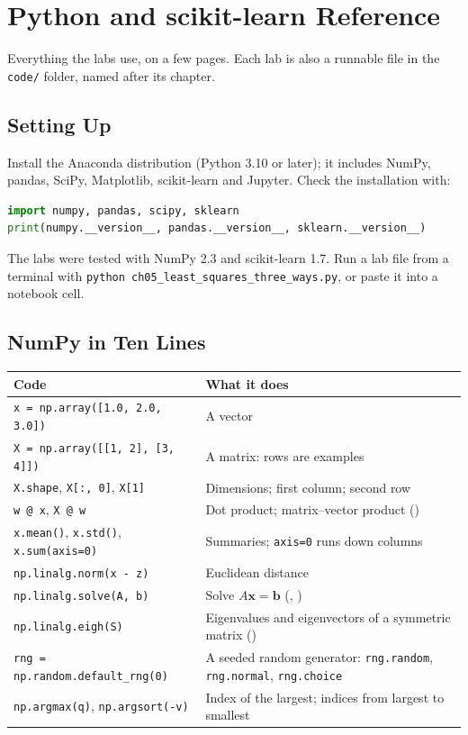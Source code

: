 \chapter{Python and scikit-learn Reference}\label{app:python}
\normalfigures

Everything the labs use, on a few pages. Each lab is also a runnable file in the
\texttt{code/} folder, named after its chapter.

\section{Setting Up}

Install the Anaconda distribution (Python 3.10 or later); it includes NumPy, pandas,
SciPy, Matplotlib, scikit-learn and Jupyter. Check the installation with:
\begin{lstlisting}[language=Python]
import numpy, pandas, scipy, sklearn
print(numpy.__version__, pandas.__version__, sklearn.__version__)
\end{lstlisting}
The labs were tested with NumPy 2.3 and scikit-learn 1.7. Run a lab file from a
terminal with \texttt{python ch05\_least\_squares\_three\_ways.py}, or paste it into a
notebook cell.

\section{NumPy in Ten Lines}

\begin{longtable}{@{}L{6.0cm}L{9.0cm}@{}}
\toprule
{}
\textbf{Code} & \textbf{What it does} \\
\midrule
\endhead
\texttt{x = np.array([1.0, 2.0, 3.0])} & A vector \\
\texttt{X = np.array([[1, 2], [3, 4]])} & A matrix: rows are examples \\
\texttt{X.shape}, \texttt{X[:, 0]}, \texttt{X[1]} & Dimensions; first column; second row \\
\texttt{w @ x}, \texttt{X @ w} & Dot product; matrix--vector product () \\
\texttt{x.mean()}, \texttt{x.std()}, \texttt{x.sum(axis=0)} & Summaries; \texttt{axis=0} runs down columns \\
\texttt{np.linalg.norm(x - z)} & Euclidean distance \\
\texttt{np.linalg.solve(A, b)} & Solve $A\mathbf{x} = \mathbf{b}$ (, ) \\
\texttt{np.linalg.eigh(S)} & Eigenvalues and eigenvectors of a symmetric matrix () \\
\texttt{rng = np.random.default\_rng(0)} & A seeded random generator: \texttt{rng.random}, \texttt{rng.normal}, \texttt{rng.choice} \\
\texttt{np.argmax(q)}, \texttt{np.argsort(-v)} & Index of the largest; indices from largest to smallest \\
\bottomrule
\end{longtable}

